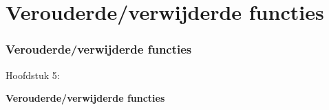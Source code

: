 %

\section{Verouderde/verwijderde functies}
\begin{frame}[fragile]
	\frametitle{Verouderde/verwijderde functies}

	\begin{center}\huge{Hoofdstuk 5:}\end{center}
	\begin{center}\huge{\color{typo3darkgrey}\textbf{Verouderde/verwijderde functies}}\end{center}

\end{frame}


